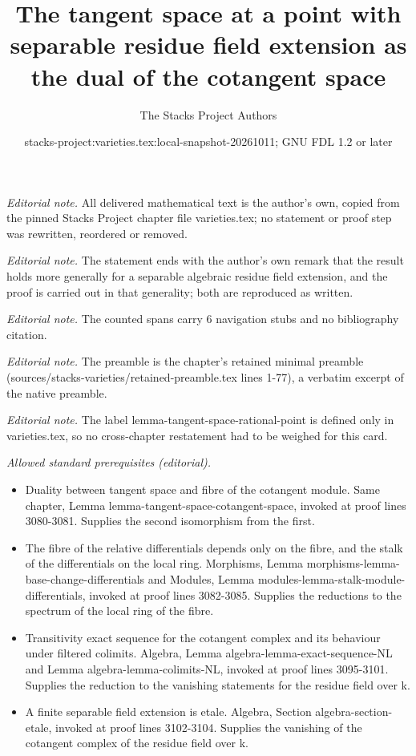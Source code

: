 \documentclass[10pt,a4paper]{amsart}
\title{The tangent space at a point with separable residue field extension as the dual of the cotangent space}
\author{The Stacks Project Authors}
\date{stacks-project:varieties.tex:local-snapshot-20261011; GNU FDL 1.2 or later}
\theoremstyle{plain}
\theoremstyle{definition}
\theoremstyle{remark}
\numberwithin{equation}{subsection}
\begin{document}
\maketitle
\noindent\textit{Editorial note.} All delivered mathematical text is the author's own, copied from the pinned Stacks Project chapter file varieties.tex; no statement or proof step was rewritten, reordered or removed.\par\medskip
\noindent\textit{Editorial note.} The statement ends with the author's own remark that the result holds more generally for a separable algebraic residue field extension, and the proof is carried out in that generality; both are reproduced as written.\par\medskip
\noindent\textit{Editorial note.} The counted spans carry 6 navigation stubs and no bibliography citation.\par\medskip
\noindent\textit{Editorial note.} The preamble is the chapter's retained minimal preamble (sources/stacks-varieties/retained-preamble.tex lines 1-77), a verbatim excerpt of the native preamble.\par\medskip
\noindent\textit{Editorial note.} The label lemma-tangent-space-rational-point is defined only in varieties.tex, so no cross-chapter restatement had to be weighed for this card.\par\medskip
\noindent\textit{Allowed standard prerequisites (editorial).}\begin{itemize}
\item Duality between tangent space and fibre of the cotangent module. Same chapter, Lemma lemma-tangent-space-cotangent-space, invoked at proof lines 3080-3081. Supplies the second isomorphism from the first.
\item The fibre of the relative differentials depends only on the fibre, and the stalk of the differentials on the local ring. Morphisms, Lemma morphisms-lemma-base-change-differentials and Modules, Lemma modules-lemma-stalk-module-differentials, invoked at proof lines 3082-3085. Supplies the reductions to the spectrum of the local ring of the fibre.
\item Transitivity exact sequence for the cotangent complex and its behaviour under filtered colimits. Algebra, Lemma algebra-lemma-exact-sequence-NL and Lemma algebra-lemma-colimits-NL, invoked at proof lines 3095-3101. Supplies the reduction to the vanishing statements for the residue field over k.
\item A finite separable field extension is etale. Algebra, Section algebra-section-etale, invoked at proof lines 3102-3104. Supplies the vanishing of the cotangent complex of the residue field over k.
\end{itemize}\medskip
\end{document}
